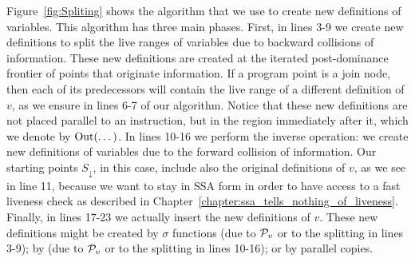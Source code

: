 Figure~\ref{fig:Spliting} shows the algorithm that we use to create new
definitions of variables.
This algorithm has three main phases.
First, in lines 3-9 we create new definitions to split the live ranges
of variables due to backward collisions of information.
These new definitions are created at the iterated post-dominance
frontier of points that originate information.
If a program point is a join node, then each of its predecessors
will contain the live range of a different definition of $v$, as we ensure
in lines 6-7 of our algorithm.
Notice that these new definitions are not placed parallel to an instruction,
but in the region immediately after it, which we denote by $\textrm{Out}(\dots)$.
In lines 10-16 we perform the inverse operation: we create new definitions of
variables due to the forward collision of information.
Our starting points $S_\downarrow$, in this case, include also the original definitions of
$v$, as we see in line 11, because we want to stay in SSA form in order to
have access to a fast liveness check as described in Chapter~\ref{chapter:ssa_tells_nothing_of_liveness}.
Finally, in lines 17-23 we actually insert the new definitions of $v$.
These new definitions might be created by $\sigma$ functions (due to ${\cal P}_v$ or
to the splitting in lines 3-9); by \phifuns (due to ${\cal P}_v$ or to the
splitting in lines 10-16); or by parallel copies.

